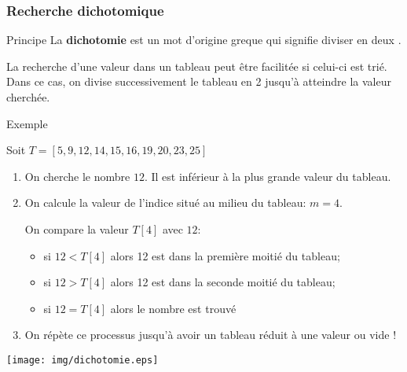\documentclass[9pt]{beamer}
\newcounter{num}
\begin{document}
\begin{frame}
\frametitle{Recherche dichotomique}

\begin{block}{Principe}
La \textbf{dichotomie} est un mot d'origine greque qui signifie \og diviser en deux \fg.

La recherche d'une valeur dans un tableau peut être facilitée si celui-ci est trié. Dans ce cas, on divise successivement le tableau en 2 jusqu'à atteindre la valeur cherchée.
\end{block}

\begin{exampleblock}{Exemple}
\begin{minipage}{7cm}
Soit $T=[5,9,12,14,15,16,19,20,23,25]$
\begin{enumerate}
\item On cherche le nombre $12$. Il est inférieur à la plus grande valeur du tableau.
\item On calcule la valeur de l'indice situé au milieu du tableau: $m=4$. \smallskip

On compare la valeur $T[4]$ avec $12$:
\begin{itemize}
\item si $12 < T[4]$ alors 12 est dans la première moitié du tableau;
\item si $12 > T[4]$ alors 12 est dans la seconde moitié du tableau;
\item si $12=T[4]$ alors le nombre est trouvé
\end{itemize}
\item On répète ce processus jusqu'à avoir un tableau réduit à une valeur ou vide !
\end{enumerate}
\end{minipage}
\begin{minipage}{5cm}
\texttt{[image: img/dichotomie.eps]}
\end{minipage}

\end{exampleblock}
\end{frame}
\end{document}
